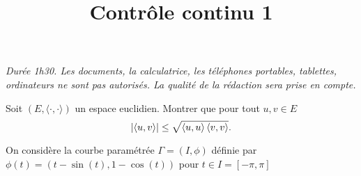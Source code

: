 \documentclass[a4paper]{tp_um}
\title{\large \sffamily\bfseries Contrôle continu 1}
\begin{document}
\maketitle
\textit{Durée 1h30. Les documents, la calculatrice, les téléphones portables, tablettes, ordinateurs ne sont pas autorisés. La qualité de la rédaction sera prise en compte.} 

\bigskip
\bigskip

  Soit $(E,\langle\cdot,\cdot\rangle)$ un espace euclidien. Montrer que pour tout $u,v\in E$ 
\[
    \left\lvert\left\langle u,v\right\rangle\right\rvert \leq \sqrt{\left\langle u,u\right\rangle \left\langle v,v\right\rangle}.
\]

\eno{\vspace*{8cm}}

\exo{} On considère la courbe paramétrée $\Gamma = (I, \phi)$ définie par $\phi(t) = (t -\sin(t), 1 - \cos(t))$ pour $t\in I =\left[-\pi, \pi \right]$ 
\end{document}
